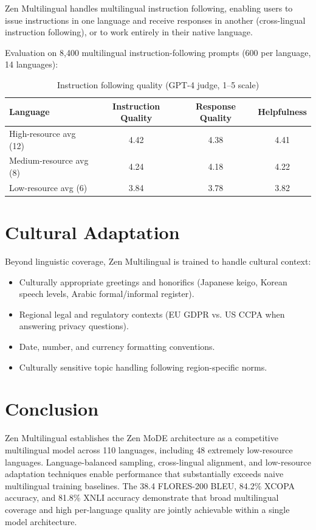 \documentclass[11pt,a4paper]{article}
\begin{document}
Zen Multilingual handles multilingual instruction following, enabling users to issue instructions in one language and receive responses in another (cross-lingual instruction following), or to work entirely in their native language.

Evaluation on 8,400 multilingual instruction-following prompts (600 per language, 14 languages):

\begin{table}[H]
\centering
\caption{Instruction following quality (GPT-4 judge, 1--5 scale)}
\label{tab:instruction}
\begin{tabular}{lccc}
\toprule
Language & Instruction Quality & Response Quality & Helpfulness \\
\midrule
High-resource avg (12) & 4.42 & 4.38 & 4.41 \\
Medium-resource avg (8) & 4.24 & 4.18 & 4.22 \\
Low-resource avg (6) & 3.84 & 3.78 & 3.82 \\
\bottomrule
\end{tabular}
\end{table}

\section{Cultural Adaptation}

Beyond linguistic coverage, Zen Multilingual is trained to handle cultural context:

\begin{itemize}
  \item Culturally appropriate greetings and honorifics (Japanese keigo, Korean speech levels, Arabic formal/informal register).
  \item Regional legal and regulatory contexts (EU GDPR vs. US CCPA when answering privacy questions).
  \item Date, number, and currency formatting conventions.
  \item Culturally sensitive topic handling following region-specific norms.
\end{itemize}

\section{Conclusion}

Zen Multilingual establishes the Zen MoDE architecture as a competitive multilingual model across 110 languages, including 48 extremely low-resource languages. Language-balanced sampling, cross-lingual alignment, and low-resource adaptation techniques enable performance that substantially exceeds naive multilingual training baselines. The 38.4 FLORES-200 BLEU, 84.2\% XCOPA accuracy, and 81.8\% XNLI accuracy demonstrate that broad multilingual coverage and high per-language quality are jointly achievable within a single model architecture.
\end{document}
